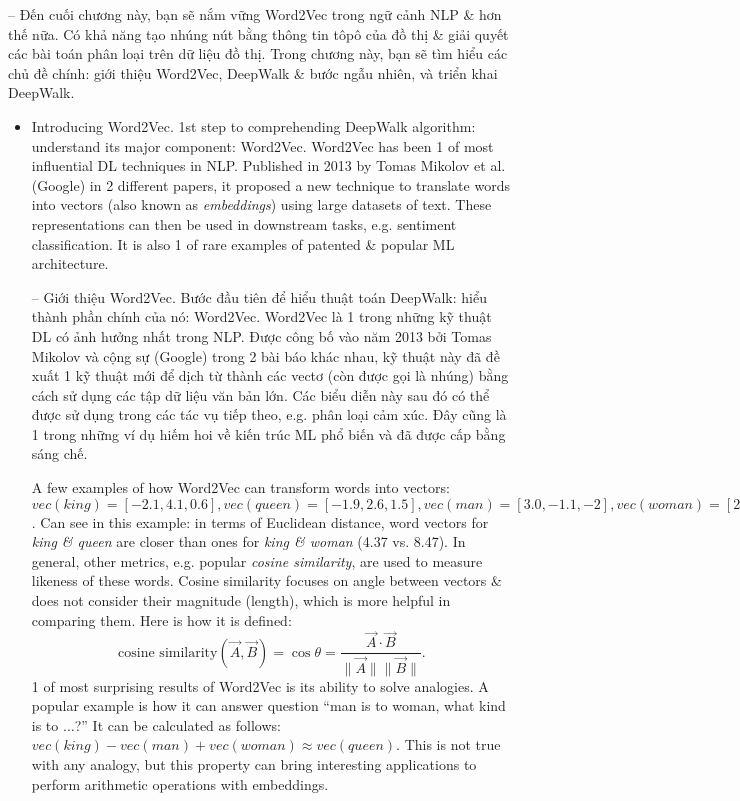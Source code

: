 \documentclass{article}
\begin{document}
\begin{itemize}
    -- Đến cuối chương này, bạn sẽ nắm vững Word2Vec trong ngữ cảnh NLP \& hơn thế nữa. Có khả năng tạo nhúng nút bằng thông tin tôpô của đồ thị \& giải quyết các bài toán phân loại trên dữ liệu đồ thị. Trong chương này, bạn sẽ tìm hiểu các chủ đề chính: giới thiệu Word2Vec, DeepWalk \& bước ngẫu nhiên, và triển khai DeepWalk.
    \begin{itemize}
        \item {\sf Introducing Word2Vec.} 1st step to comprehending DeepWalk algorithm: understand its major component: Word2Vec. Word2Vec has been 1 of most influential DL techniques in NLP. Published in 2013 by {\sc Tomas Mikolov} et al. (Google) in 2 different papers, it proposed a new technique to translate words into vectors (also known as {\it embeddings}) using large datasets of text. These representations can then be used in downstream tasks, e.g. sentiment classification. It is also 1 of rare examples of patented \& popular ML architecture.

        -- {\sf Giới thiệu Word2Vec.} Bước đầu tiên để hiểu thuật toán DeepWalk: hiểu thành phần chính của nó: Word2Vec. Word2Vec là 1 trong những kỹ thuật DL có ảnh hưởng nhất trong NLP. Được công bố vào năm 2013 bởi {\sc Tomas Mikolov} và cộng sự (Google) trong 2 bài báo khác nhau, kỹ thuật này đã đề xuất 1 kỹ thuật mới để dịch từ thành các vectơ (còn được gọi là {\sc nhúng}) bằng cách sử dụng các tập dữ liệu văn bản lớn. Các biểu diễn này sau đó có thể được sử dụng trong các tác vụ tiếp theo, e.g. phân loại cảm xúc. Đây cũng là 1 trong những ví dụ hiếm hoi về kiến trúc ML phổ biến và đã được cấp bằng sáng chế.

        A few examples of how Word2Vec can transform words into vectors: $vec(king) = [-2.1,4.1,0.6],vec(queen) = [-1.9,2.6,1.5],vec(man) = [3.0,-1.1,-2],vec(woman) = [2.8,-2.6,-1.1]$. Can see in this example: in terms of Euclidean distance, word vectors for {\it king \& queen} are closer than ones for {\it king \& woman} (4.37 vs. 8.47). In general, other metrics, e.g. popular {\it cosine similarity}, are used to measure likeness of these words. Cosine similarity focuses on angle between vectors \& does not consider their magnitude (length), which is more helpful in comparing them. Here is how it is defined:
        \begin{equation*}
            \mbox{cosine similarity}(\vec{A},\vec{B}) = \cos\theta = \frac{\vec{A}\cdot\vec{B}}{\|\vec{A}\|\|\vec{B}\|}.
        \end{equation*}
        1 of most surprising results of Word2Vec is its ability to solve analogies. A popular example is how it can answer question ``man is to woman, what kind is to $\ldots$?'' It can be calculated as follows: $vec(king) - vec(man) + vec(woman)\approx vec(queen)$. This is not true with any analogy, but this property can bring interesting applications to perform arithmetic operations with embeddings.


\end{itemize}
\end{itemize}
\end{document}
